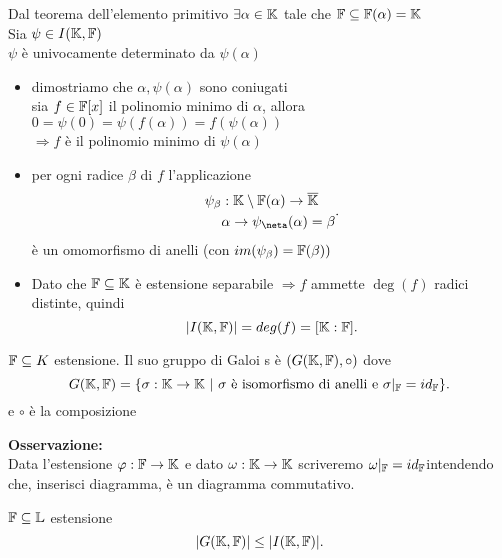 \documentclass[12px]{article}
\begin{document}
 \begin{dimo}
 	Dal teorema dell'elemento primitivo $\exists \alpha\in\mathbb{K}$ tale che  $\mathbb{F}\subseteq\mathbb{F}(\alpha) = \mathbb{K}$ \\
	Sia $ \psi\in I(\mathbb{K},\mathbb{F})$ \\
	$\psi$ è univocamente determinato da $\psi(\alpha)$
	 \begin{itemize}
		 \item dimostriamo che $\alpha, \psi(\alpha)$ sono coniugati\\
			 sia  $f\in\mathbb{F}[x]$ il polinomio minimo di  $\alpha$, allora $0=\psi(0)=\psi(f(\alpha)) = f(\psi(\alpha))$  \\
			 $ \Rightarrow  f$ è il polinomio minimo di $\psi(\alpha)$
		 \item per ogni radice  $\beta$ di $f$ l'applicazione
			 \[
			 \begin{aligned}
				 \psi_{\beta }&:\K\setminus \F(\alpha) \rightarrow \overline\K\\
					      &\alpha \rightarrow \psi_\neta(\alpha) = \beta
			 \end{aligned}
			 .\] 
			 è un omomorfismo di anelli (con $im(\psi_\beta) = \mathbb{F}(\beta))$
		 \item Dato che  $\mathbb{F}\subseteq\mathbb{K}$ è estensione separabile  $ \Rightarrow f$ ammette $\deg(f)$ radici distinte, quindi
			  \[
				  |I(\mathbb{K},\mathbb{F})| = deg(f) = [\mathbb{K}:\mathbb{F}]
			 .\] 
	\end{itemize}
 \end{dimo}
 \begin{defi}
 	$\mathbb{F}\subseteq K$ estensione. Il suo gruppo di Galoi s è $(G(\mathbb{K},\mathbb{F}),\circ)$ dove
	 \[
		 G(\mathbb{K},\mathbb{F}) = \{\sigma: \mathbb{K} \rightarrow \mathbb{K} \ | \ \sigma \text{ è isomorfismo di anelli e }\sigma|_{\mathbb{F}} = id_{\mathbb{F}}\}
	.\] 
	e $\circ$ è la composizione
 \end{defi}
 \textbf{Osservazione:}\\
 Data l'estensione $ \varphi: \mathbb{F} \rightarrow \mathbb{K}$ e dato $\omega: \mathbb{K}  \rightarrow\mathbb{K}$ scriveremo $\omega|_{\mathbb{F}} = id_{\mathbb{F}}$intendendo che, inserisci diagramma, è un diagramma commutativo.
  \begin{prop}
 	$\mathbb{F}\subseteq\mathbb{L}$ estensione 
	 \[
	|G(\mathbb{K},\mathbb{F})|\leq |I(\mathbb{K},\mathbb{F})|
	.\] 
 \end{prop}
\end{document}
